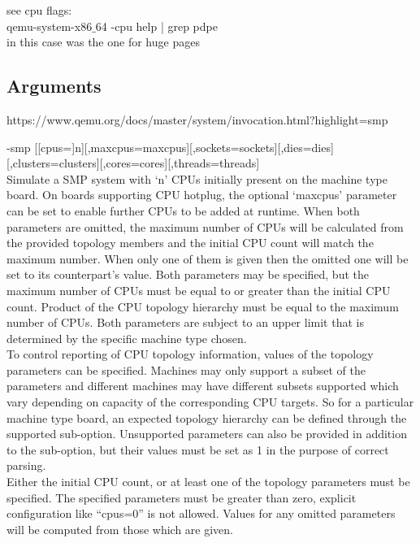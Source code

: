 \documentclass[11pt, a4paper, oneside]{article}
\theoremstyle{definition}
\begin{document}
see cpu flags:\\
qemu-system-x86$\_$64 -cpu help | grep pdpe\\
in this case was the one for huge pages\\


\subsection{Arguments}
https://www.qemu.org/docs/master/system/invocation.html?highlight=smp

-smp [[cpus=]n][,maxcpus=maxcpus][,sockets=sockets][,dies=dies][,clusters=clusters][,cores=cores][,threads=threads]\\

    Simulate a SMP system with ‘n’ CPUs initially present on the machine type board. On boards supporting CPU hotplug, the optional ‘maxcpus’ parameter can be set to enable further CPUs to be added at runtime. When both parameters are omitted, the maximum number of CPUs will be calculated from the provided topology members and the initial CPU count will match the maximum number. When only one of them is given then the omitted one will be set to its counterpart’s value. Both parameters may be specified, but the maximum number of CPUs must be equal to or greater than the initial CPU count. Product of the CPU topology hierarchy must be equal to the maximum number of CPUs. Both parameters are subject to an upper limit that is determined by the specific machine type chosen.\\

    To control reporting of CPU topology information, values of the topology parameters can be specified. Machines may only support a subset of the parameters and different machines may have different subsets supported which vary depending on capacity of the corresponding CPU targets. So for a particular machine type board, an expected topology hierarchy can be defined through the supported sub-option. Unsupported parameters can also be provided in addition to the sub-option, but their values must be set as 1 in the purpose of correct parsing.\\

    Either the initial CPU count, or at least one of the topology parameters must be specified. The specified parameters must be greater than zero, explicit configuration like “cpus=0” is not allowed. Values for any omitted parameters will be computed from those which are given.\\
\end{document}
